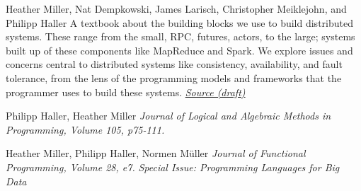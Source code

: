 \documentclass[9pt]{article}
\begin{document}
\newline\noindent Heather Miller, Nat Dempkowski, James Larisch,
\newline\noindent Christopher Meiklejohn, and Philipp Haller
\smallskip
\newline\noindent A textbook about the building blocks we use to build distributed systems. These range from the small, RPC, futures, actors, to the large; systems built up of these components like MapReduce and Spark. We explore issues and concerns central to distributed systems like consistency, availability, and fault tolerance, from the lens of the programming models and frameworks that the programmer uses to build these systems.
\newline\noindent\href{https://github.com/heathermiller/dist-prog-book}{\em Source (draft)}
\bigskip

\pagebreak



\newline\noindent Philipp Haller, Heather Miller
\newline\noindent\emph{Journal of Logical and Algebraic Methods in Programming, Volume 105, p75-111.}
\bigskip

\newline{}
\newline\noindent Heather Miller, Philipp Haller, Normen M\"{u}ller
\newline\noindent\emph{Journal of Functional Programming, Volume 28, e7.}
\newline\noindent\emph{Special Issue: Programming Languages for Big Data}
\bigskip
\end{document}
